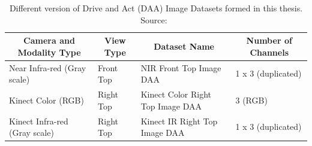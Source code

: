 \begin{table}[t]
\caption[Different version of Drive and Act (DAA) Image Datasets formed in this thesis.]{Different version of Drive and Act (DAA) Image Datasets formed in this thesis. Source:~\citep{martin2019drive_and_act_2019_iccv}}
\label{table for different daa dataset versions formed in this thesis}
\begin{center}
\small
\begin{tabular}{llll}
\multicolumn{1}{c}{\bf Camera and Modality Type}  &\multicolumn{1}{c}{\bf View Type} &\multicolumn{1}{c}{\bf Dataset Name} &\multicolumn{1}{c}{\bf Number of Channels}
\\ \hline 
Near Infra-red (Gray scale)  &Front Top & NIR Front Top Image DAA & 1 x 3 (duplicated)
\\ \hline 
Kinect Color (RGB)  &Right Top & Kinect Color Right Top Image DAA & 3 (RGB)
\\ \hline 
Kinect Infra-red (Gray scale)  &Right Top & Kinect IR Right Top Image DAA & 1 x 3 (duplicated)
\\ \hline
\end{tabular}
\end{center}
\end{table}

